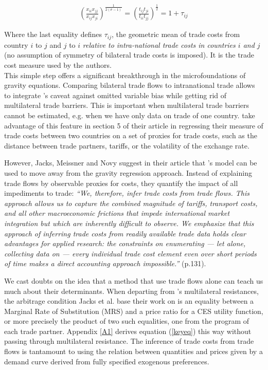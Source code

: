 \documentclass{article}
\begin{document}
\begin{eqnarray}
\left( \frac{x_{ii} x_{jj}}{x_{ij} x_{ji}}\right)^{\frac{1}{2(\sigma-1)}} =\left(\frac{t_{ij} t_{ji}}{t_{ii} t_{jj}} \right)^{\frac{1}{2}} = 1+\tau_{ij} \label{keyeq}
\end{eqnarray}

Where the last equality defines $\tau_{ij}$, the geometric mean
of trade costs from country $i$ to $j$ and $j$ to $i$
\emph{relative to intra-national trade costs in countries $i$
and $j$} (no assumption of symmetry of bilateral trade costs is
imposed). It is the trade cost measure used by the authors.\\

This simple step offers a significant breakthrough in the
microfoundations of gravity equations. Comparing bilateral
trade flows to intranational trade allows to integrate
\cite{AW2003}'s caveat against omitted variable bias while
getting rid of multilateral trade barriers. This is important
when multilateral trade barriers cannot be estimated, e.g. when
we have only data on trade of one country. \cite{JMN2011} take
advantage of this feature in section 5 of their article in
regressing their measure of trade costs between two countries
on a set of proxies for trade costs, such as the distance
between trade partners, tariffs, or the volatility of the
exchange rate.

However, Jacks, Meissner and Novy suggest in their article that
\cite{AW2003}'s model can be used to move away from the gravity
regression approach. Instead of explaining trade flows by
observable proxies for costs, they quantify the impact of all
impediments to trade: \emph{``We, therefore, infer trade costs
from trade flows. This approach allows us to capture the
combined magnitude of tariffs, transport costs, and all other
macroeconomic frictions that impede international market
integration but which are inherently difficult to observe. We
emphasize that this approach of inferring trade costs from
readily available trade data holds clear advantages for applied
research: the constraints on enumerating — let alone,
collecting data on — every individual trade cost element
even over short periods of time makes a direct accounting
approach impossible.''} (p.131).

We cast doubts on the idea that a method that use trade flows
alone can teach us much about their determinants. When
departing from \cite{AW2003}'s multilateral resistances, the
arbitrage condition Jacks et al. base their work on is an
equality between a Marginal Rate of Substitution (MRS) and a
price ratio for a CES utility function, or more precisely the
product of two such equalities, one from the program of each
trade partner. Appendix \ref{A1} derives equation (\ref{keyeq})
this way without passing through multilateral resistance. The
inference of trade costs from trade flows is tantamount to
using the relation between quantities and prices given by a
demand curve derived from fully specified exogenous
preferences.
\end{document}
